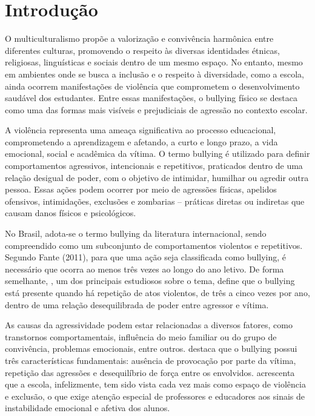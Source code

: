 \pagestyle{simple}
\chapter[]{Introdução}

	O multiculturalismo propõe a valorização e convivência harmônica entre diferentes culturas, promovendo o respeito às diversas identidades étnicas, religiosas, linguísticas e sociais dentro de um mesmo espaço. No entanto, mesmo em ambientes onde se busca a inclusão e o respeito à diversidade, como a escola, ainda ocorrem manifestações de violência que comprometem o desenvolvimento saudável dos estudantes. Entre essas manifestações, o bullying físico se destaca como uma das formas mais visíveis e prejudiciais de agressão no contexto escolar. 
	
	A violência representa uma ameaça significativa ao processo educacional, comprometendo a aprendizagem e afetando, a curto e longo prazo, a vida emocional, social e acadêmica da vítima. O termo bullying é utilizado para definir comportamentos agressivos, intencionais e repetitivos, praticados dentro de uma relação desigual de poder, com o objetivo de intimidar, humilhar ou agredir outra pessoa. Essas ações podem ocorrer por meio de agressões físicas, apelidos ofensivos, intimidações, exclusões e zombarias – práticas diretas ou indiretas que causam danos físicos e psicológicos. 
	
	No Brasil, adota-se o termo bullying da literatura internacional, sendo compreendido como um subconjunto de comportamentos violentos e repetitivos. Segundo Fante (2011), para que uma ação seja classificada como bullying, é necessário que ocorra ao menos três vezes ao longo do ano letivo. De forma semelhante, , um dos principais estudiosos sobre o tema, define que o bullying está presente quando há repetição de atos violentos, de três a cinco vezes por ano, dentro de uma relação desequilibrada de poder entre agressor e vítima. 
	
	As causas da agressividade podem estar relacionadas a diversos fatores, como transtornos comportamentais, influência do meio familiar ou do grupo de convivência, problemas emocionais, entre outros.  destaca que o bullying possui três características fundamentais: ausência de provocação por parte da vítima, repetição das agressões e desequilíbrio de força entre os envolvidos.  acrescenta que a escola, infelizmente, tem sido vista cada vez mais como espaço de violência e exclusão, o que exige atenção especial de professores e educadores aos sinais de instabilidade emocional e afetiva dos alunos. 
	
